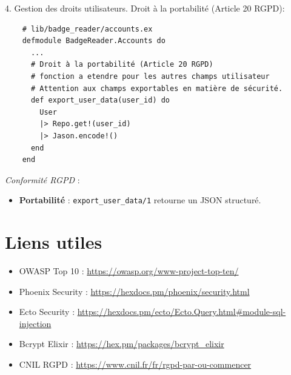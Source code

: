\begin{for_you}{4. Gestion des droits utilisateurs. Droit à la portabilité (Article 20 RGPD):}
    \begin{lstlisting}
    # lib/badge_reader/accounts.ex
    defmodule BadgeReader.Accounts do
      ...
      # Droit à la portabilité (Article 20 RGPD)
      # fonction a etendre pour les autres champs utilisateur
      # Attention aux champs exportables en matière de sécurité.
      def export_user_data(user_id) do
        User
        |> Repo.get!(user_id)
        |> Jason.encode!() 
      end
    end
    \end{lstlisting}

    \textit{Conformité RGPD} :
    \begin{itemize}
        \item \textbf{Portabilité} : \texttt{export\_user\_data/1} retourne un JSON structuré.
    \end{itemize}
\end{for_you}

\section{Liens utiles}

\begin{itemize}
    \item OWASP Top 10 : \url{https://owasp.org/www-project-top-ten/}
    \item Phoenix Security : \url{https://hexdocs.pm/phoenix/security.html}
    \item Ecto Security : \url{https://hexdocs.pm/ecto/Ecto.Query.html#module-sql-injection}
    \item Bcrypt Elixir : \url{https://hex.pm/packages/bcrypt_elixir}
    \item CNIL RGPD : \url{https://www.cnil.fr/fr/rgpd-par-ou-commencer}
\end{itemize}

